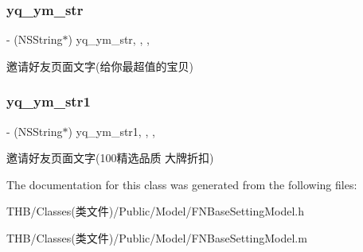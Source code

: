 \subsubsection{\texorpdfstring{yq\+\_\+ym\+\_\+str}{yq\_ym\_str}}
{\footnotesize\ttfamily -\/ (N\+S\+String$\ast$) yq\+\_\+ym\+\_\+str\hspace{0.3cm}{\ttfamily [read]}, {\ttfamily [write]}, {\ttfamily [nonatomic]}, {\ttfamily [copy]}}

邀请好友页面文字(给你最超值的宝贝) \mbox{\label{interface_f_n_base_setting_model_ab8294190dd52c7d7340b6c7d852b7861}} 
\subsubsection{\texorpdfstring{yq\+\_\+ym\+\_\+str1}{yq\_ym\_str1}}
{\footnotesize\ttfamily -\/ (N\+S\+String$\ast$) yq\+\_\+ym\+\_\+str1\hspace{0.3cm}{\ttfamily [read]}, {\ttfamily [write]}, {\ttfamily [nonatomic]}, {\ttfamily [copy]}}

邀请好友页面文字(100精选品质 大牌折扣) 

The documentation for this class was generated from the following files\+:\begin{DoxyCompactItemize}
\item 
T\+H\+B/\+Classes(类文件)/\+Public/\+Model/F\+N\+Base\+Setting\+Model.\+h\item 
T\+H\+B/\+Classes(类文件)/\+Public/\+Model/F\+N\+Base\+Setting\+Model.\+m\end{DoxyCompactItemize}
